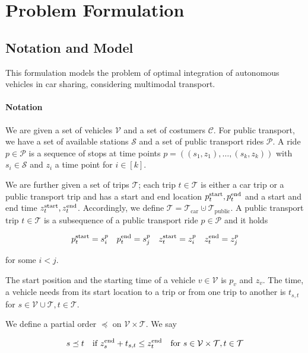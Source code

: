 \section{Problem Formulation}

\subsection{Notation and Model}

This formulation models the problem of optimal integration of autonomous vehicles in car sharing, considering multimodal transport.

\paragraph{Notation} \parfill

We are given a set of vehicles $\mathcal{V}$ and a set of costumers $\mathcal{C}$. For public transport, we have a set of available stations $\mathcal{S}$ and a set of public transport rides $\mathcal{P}$. A ride $p\in \mathcal{P}$ is a sequence of stops at time points $p=\left(\left(s_1,z_1\right),\dots,\left(s_k,z_k\right)\right)$ with $s_i\in\mathcal{S}$ and $z_i$ a time point for $i\in[k]$. 

We are further given a set of trips $\mathcal{T}$; each trip $t\in\mathcal{T}$ is either a car trip or a public transport trip and has a start and end location $p^{\operatorname{start}}_t, p^{\operatorname{end}}_t$ and a start and end time $z^{\operatorname{start}}_t, z^{\operatorname{end}}_t$. Accordingly, we define $\mathcal{T} = \mathcal{T}_{\operatorname{car}}\cupdot\mathcal{T}_{\operatorname{public}}$. A public transport trip $t\in\mathcal{T}$ is a subsequence of a public transport ride $p\in\mathcal{P}$ and it holds

\begin{align*}
	p^{\operatorname{start}}_t = s^p_i & &  p^{\operatorname{end}}_t = s^p_j & & z^{\operatorname{start}}_t = z^p_i & & z^{\operatorname{end}}_t = z^p_j
\end{align*}

for some $i<j$.

The start position and the starting time of a vehicle $v\in\mathcal{V}$ is $p_v$ and $z_v$. The time, a vehicle needs from its start location to a trip or from one trip to another is $t_{s,t}$ for $s\in\mathcal{V}\cup\mathcal{T}, t\in\mathcal{T}$.

We define a partial order $\preceq$ on $\mathcal{V}\times\mathcal{T}$. We say

\begin{align*}
	s\preceq t & & \text{if } z^{\operatorname{end}}_s + t_{s,t} \leq z^{\operatorname{end}}_t & & \text{for } s\in\mathcal{V}\times\mathcal{T}, t\in\mathcal{T}
\end{align*}

